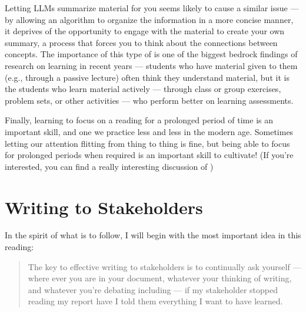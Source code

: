 \documentclass[letterpaper,10pt,english]{jupyterBook}
\begin{document}
\sphinxAtStartPar
Letting LLMs summarize material for you seems likely to cause a similar issue — by allowing an algorithm to organize the information in a more concise manner, it deprives  of the opportunity to engage with the material to create your own summary, a process that forces you to  think about the connections between concepts. The importance of this type of  is one of the biggest bedrock findings of research on learning in recent years — students who have material given to them (e.g., through a passive lecture) often think they understand material, but it is the students who learn material actively — through class or group exercises, problem sets, or other activities — who perform better on learning assessments.

\sphinxAtStartPar
Finally, learning to focus on a reading for a prolonged period of time is an important skill, and one we practice less and less in the modern age. Sometimes letting our attention flitting from thing to thing is fine, but being able to focus for prolonged periods when required is an important skill to cultivate! (If you’re interested, you can find a really interesting discussion of )

\sphinxstepscope


\chapter{Writing to Stakeholders}
\label{\detokenize{40_in_practice/25_writing_to_stakeholders:writing-to-stakeholders}}\label{\detokenize{40_in_practice/25_writing_to_stakeholders::doc}}
\sphinxAtStartPar
In the spirit of what is to follow, I will begin with the most important idea in this reading:
\begin{quote}

\sphinxAtStartPar
The key to effective writing to stakeholders is to continually ask yourself — where ever you are in your document, whatever your thinking of writing, and whatever you’re debating including — if my stakeholder stopped reading my report  have I told them everything I want  to have learned.
\end{quote}
\end{document}
